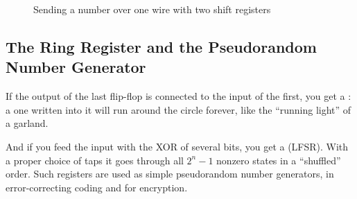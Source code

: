 \begin{figure}[H]
\centering
{}
\caption{Sending a number over one wire with two shift registers}
\end{figure}

\subsection{The Ring Register and the Pseudorandom Number Generator}

If the output of the last flip-flop is connected to the input of the first, you
get a : a one written into it will run around the circle
forever, like the ``running light'' of a garland. 

And if you feed the input with the XOR of several bits, you get a
 (LFSR). With a proper choice of
taps it goes through all $2^n-1$ nonzero states in a ``shuffled''
order. Such registers are used as simple pseudorandom number generators, in
error-correcting coding and for encryption.

